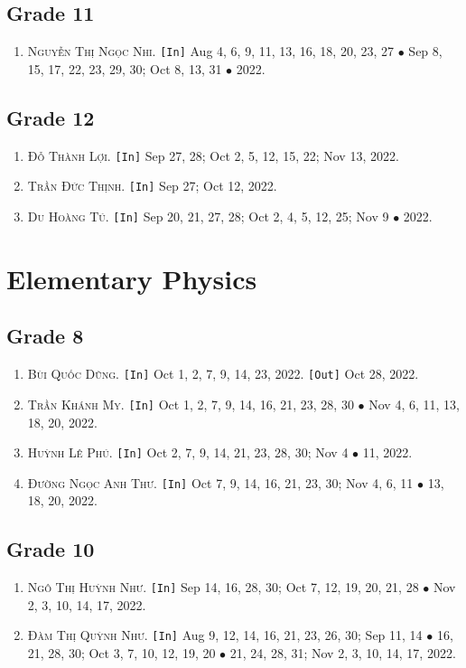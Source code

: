 \documentclass{article}
\numberwithin{equation}{section}
\begin{document}
\subsection{Grade 11}
\begin{enumerate}
	\item \textsc{Nguyễn Thị Ngọc Nhi.} \texttt{[In]} Aug 4, 6, 9, 11, 13, 16, 18, 20, 23, 27 $\bullet$ Sep 8, 15, 17, 22, 23, 29, 30; Oct 8, 13, 31 $\bullet$ 2022.
\end{enumerate}

\subsection{Grade 12}
\begin{enumerate}
	\item \textsc{Đỗ Thành Lợi.} \texttt{[In]} Sep 27, 28; Oct 2, 5, 12, 15, 22; Nov 13, 2022.
	\item \textsc{Trần Đức Thịnh.} \texttt{[In]} Sep 27; Oct 12, 2022.
	\item \textsc{Du Hoàng Tú.} \texttt{[In]} Sep 20, 21, 27, 28; Oct 2, 4, 5, 12, 25; Nov 9 $\bullet$ 2022.
\end{enumerate}


\section{Elementary Physics}

\subsection{Grade 8}
\begin{enumerate}
	\item \textsc{Bùi Quốc Dũng.} \texttt{[In]} Oct 1, 2, 7, 9, 14, 23, 2022. \texttt{[Out]} Oct 28, 2022.
	\item \textsc{Trần Khánh My.} \texttt{[In]} Oct 1, 2, 7, 9, 14, 16, 21, 23, 28, 30 $\bullet$ Nov 4, 6, 11, 13, 18, 20, 2022.
	\item \textsc{Huỳnh Lê Phú.} \texttt{[In]} Oct 2, 7, 9, 14, 21, 23, 28, 30; Nov 4 $\bullet$ 11, 2022.
	\item \textsc{Đường Ngọc Anh Thư.} \texttt{[In]} Oct 7, 9, 14, 16, 21, 23, 30; Nov 4, 6, 11 $\bullet$ 13, 18, 20, 2022.
\end{enumerate}

\subsection{Grade 10}
\begin{enumerate}
	\item \textsc{Ngô Thị Huỳnh Như.} \texttt{[In]} Sep 14, 16, 28, 30; Oct 7, 12, 19, 20, 21, 28 $\bullet$ Nov 2, 3, 10, 14, 17, 2022.
	\item \textsc{Đàm Thị Quỳnh Như.} \texttt{[In]} Aug 9, 12, 14, 16, 21, 23, 26, 30; Sep 11, 14 $\bullet$ 16, 21, 28, 30; Oct 3, 7, 10, 12, 19, 20 $\bullet$ 21, 24, 28, 31; Nov 2, 3, 10, 14, 17, 2022.
\end{enumerate}
\end{document}
